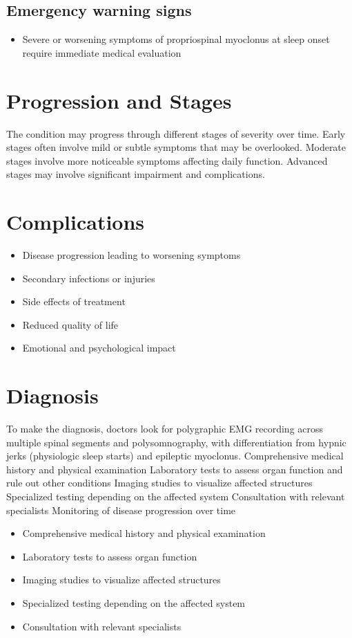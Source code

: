 \subsection{Emergency warning signs}
\begin{itemize}[noitemsep]
  \item Severe or worsening symptoms of propriospinal myoclonus at sleep onset require immediate medical evaluation
\end{itemize}
\section{Progression and Stages}
The condition may progress through different stages of severity over time. Early stages often involve mild or subtle symptoms that may be overlooked. Moderate stages involve more noticeable symptoms affecting daily function. Advanced stages may involve significant impairment and complications.
\section{Complications}
\begin{itemize}[noitemsep]
  \item Disease progression leading to worsening symptoms
  \item Secondary infections or injuries
  \item Side effects of treatment
  \item Reduced quality of life
  \item Emotional and psychological impact
\end{itemize}
\section{Diagnosis}
To make the diagnosis, doctors look for polygraphic EMG recording across multiple spinal segments and polysomnography, with differentiation from hypnic jerks (physiologic sleep starts) and epileptic myoclonus. Comprehensive medical history and physical examination Laboratory tests to assess organ function and rule out other conditions Imaging studies to visualize affected structures Specialized testing depending on the affected system Consultation with relevant specialists Monitoring of disease progression over time

\begin{itemize}[noitemsep]
  \item Comprehensive medical history and physical examination
  \item Laboratory tests to assess organ function
  \item Imaging studies to visualize affected structures
  \item Specialized testing depending on the affected system
  \item Consultation with relevant specialists
\end{itemize}
